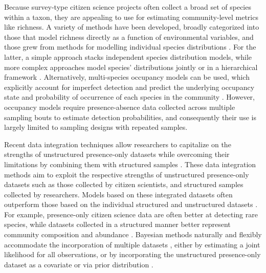 \documentclass[preprint,review,times,12pt]{elsarticle}
\begin{document}
Because survey-type citizen science projects often collect a broad set of species within a taxon, they are appealing to use for estimating community-level metrics like richness. A variety of methods have been developed, broadly categorized into those that model richness directly as a function of environmental variables, and those grew from methods for modelling individual species distributions \citep{Dubuis2011,Guisan2011,Calabrese2014,Biber2019}. For the latter, a simple approach stacks independent species distribution models, while more complex approaches model species' distributions jointly or in a hierarchical framework \citep{Caradima2019}. Alternatively, multi-species occupancy models can be used, which explicitly account for imperfect detection and predict the underlying occupancy state and probability of occurrence of each species in the community \citep{Frishkoff2019,Guillera-Arroita2019,Szewczyk2018,Devarajan2020}. However, occupancy models require presence-absence data collected across multiple sampling bouts to estimate detection probabilities, and consequently their use is largely limited to sampling designs with repeated samples.

Recent data integration techniques allow researchers to capitalize on the strengths of unstructured presence-only datasets while overcoming their limitations by combining them with structured samples \citep{Isaac2019,Miller2019}. These data integration methods aim to exploit the respective strengths of unstructured presence-only datasets such as those collected by citizen scientists, and structured samples collected by researchers. Models based on these integrated datasets often outperform those based on the individual structured and unstructured datasets \citep{Dorazio2014b,Fithian2015,Koshkina2017a}. For example, presence-only citizen science data are often better at detecting rare species, while datasets collected in a structured manner better represent community composition and abundance \citep{Steen2019,Henckel2020,Pernat2020}. Bayesian methods naturally and flexibly accommodate the incorporation of multiple datasets \citep{Clark2005,BeckEtAl2012,Szewczyk2018}, either by estimating a joint likelihood for all observations, or by incorporating the unstructured presence-only dataset as a covariate or via prior distribution \citep{Fletcher2019,Isaac2019,Miller2019}. 
\end{document}

